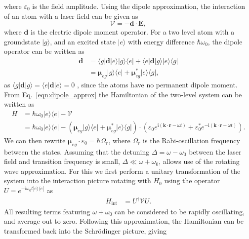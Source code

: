 where $\varepsilon_0$ is the field amplitude. Using the dipole approximation, the interaction of an atom with a laser field can be given as~\cite{BK:Foot_2005}
\begin{equation}
\mathcal{V} = -{\mathbf{d}}\cdot {\mathbf{E}},
\end{equation}
where ${\mathbf{d}}$ is the electric dipole moment operator. For a two level atom with a groundstate $| g \rangle$, and an excited state $| e \rangle$ with energy difference $\hbar \omega_0$, the dipole operator can be written as
\begin{align}\label{eqn:dipole_approx}
\mathbf{d} &= \langle g|\mathbf{d}|e \rangle | g \rangle \langle e | + \langle e|\mathbf{d}|g \rangle | e \rangle \langle g | \nonumber \\
&= \boldsymbol{\mu}_{eg} | g \rangle \langle e | + \boldsymbol{\mu}_{eg}^{*} | e \rangle \langle g |,
\end{align}
as $\langle g|\mathbf{d}|g \rangle = \langle e|\mathbf{d}|e \rangle  = 0$ , since the atoms have no permanent dipole moment. From Eq.~\eqref{eqn:dipole_approx} the Hamiltonian of the two-level system can be written as
\begin{align}
    H &= \hbar\omega_0 |e\rangle\langle e |  - \mathcal{V} \nonumber \\
      &=  \hbar\omega_0 |e\rangle\langle e | - (\boldsymbol{\mu}_{eg} | g \rangle \langle e | + \boldsymbol{\mu}_{eg}^{*} | e \rangle \langle g |)\cdot ( \varepsilon_0 e^{\textrm{i}\left(\mathbf{k}\cdot\mathbf{r} - \omega t\right)} +  \varepsilon_0^{*} e^{-\textrm{i}\left(\mathbf{k}\cdot\mathbf{r} - \omega t\right)}).
\end{align}
We can then rewrite $\boldsymbol{\mu}_{eg}\cdot \varepsilon_0 = \hbar\Omega_r$, where $\Omega_r$ is the Rabi-oscillation frequency between the states. Assuming that the detuning $\Delta = \omega - \omega_0$ between the laser field and transition frequency is small, $\Delta \ll \omega + \omega_0$, allows use of the rotating wave approximation. For this we first perform a unitary transformation of the system into the interaction picture rotating with $H_0$ using the operator $U = e^{-\textrm{i}\omega_0 t|e\rangle\langle e|}$ as
\begin{align}
    H_{\textrm{int}} & = U^{\dagger} \mathcal{V} U.
\end{align}
All resulting terms featuring $\omega + \omega_0$ can be considered to be rapidly oscillating, and average out to zero. Following this approximation, the Hamiltonian can be transformed back into the Schr\"odinger picture, giving

